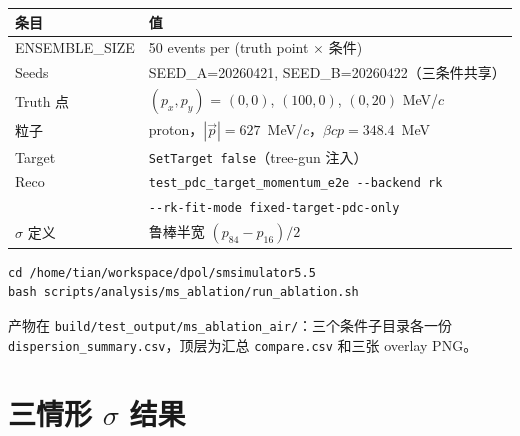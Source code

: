\documentclass[a4paper, 11pt]{article}
\begin{document}
\begin{center}
\begin{tabular}{ll}
\toprule
条目 & 值 \\
\midrule
ENSEMBLE\_SIZE              & 50 events per (truth point $\times$ 条件) \\
Seeds                       & SEED\_A=20260421, SEED\_B=20260422（三条件共享） \\
Truth 点                    & $(p_x, p_y)$ = $(0,0)$, $(100,0)$, $(0,20)$ MeV/$c$ \\
粒子                        & proton，$|\vec p|=627$~MeV/$c$，$\beta c p = 348.4$~MeV \\
Target                      & \texttt{SetTarget false}（tree-gun 注入） \\
Reco                        & \verb|test_pdc_target_momentum_e2e --backend rk| \\
                            & \verb|--rk-fit-mode fixed-target-pdc-only| \\
$\sigma$ 定义               & 鲁棒半宽 $(p_{84}-p_{16})/2$ \\
\bottomrule
\end{tabular}
\end{center}

\begin{verbatim}
cd /home/tian/workspace/dpol/smsimulator5.5
bash scripts/analysis/ms_ablation/run_ablation.sh
\end{verbatim}

产物在 \verb|build/test_output/ms_ablation_air/|：三个条件子目录各一份 \texttt{dispersion\_summary.csv}，顶层为汇总 \texttt{compare.csv} 和三张 overlay PNG。

\section{三情形 $\sigma$ 结果}
\end{document}
